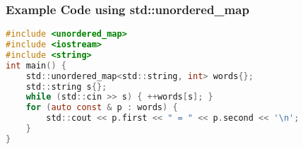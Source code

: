 \subsubsection{Example Code using std::unordered\_map}
\begin{lstlisting}[style=frame, style= linenumbers, language=C]
#include <unordered_map>
#include <iostream>
#include <string>
int main() {
    std::unordered_map<std::string, int> words{};
    std::string s{};
    while (std::cin >> s) { ++words[s]; }
    for (auto const & p : words) {
        std::cout << p.first << " = " << p.second << '\n';
    }
}
\end{lstlisting}